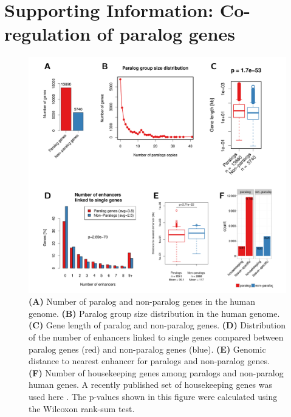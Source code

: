 \documentclass[a4paper,twoside=true,openright,parskip=full,chapterprefix=true,11pt,headings=normal,bibliography=totoc,listof=totoc,titlepage=on,captions=tableabove,draft=false]{scrreprt}
\theoremstyle{definition}
\theoremstyle{definition}
\theoremstyle{definition}
\theoremstyle{remark}
\begin{document}
\hypertarget{appendix-appendix}{%
\appendix}


\hypertarget{sup-paralog-regulation}{%
\chapter{Supporting Information: Co-regulation of paralog
genes}\label{sup-paralog-regulation}}

\begin{figure}

{\centering \includegraphics[width=0.8\linewidth]{figures/paralog/SI/figS1} 

}

\caption{\textbf{(A)} Number of paralog and non-paralog genes
in the human genome. \textbf{(B)} Paralog group size distribution in the
human genome. \textbf{(C)} Gene length of paralog and non-paralog genes.
\textbf{(D)} Distribution of the number of enhancers linked to single
genes compared between paralog genes (red) and non-paralog genes (blue).
\textbf{(E)} Genomic distance to nearest enhancer for paralogs and
non-paralog genes. \textbf{(F)} Number of housekeeping genes among
paralogs and non-paralog human genes. A recently published set of
housekeeping genes was used here \citep{Eisenberg2013}. The p-values
shown in this figure were calculated using the Wilcoxon rank-sum test.}\label{fig:paraVSnonPara}
\end{figure}
\end{document}
